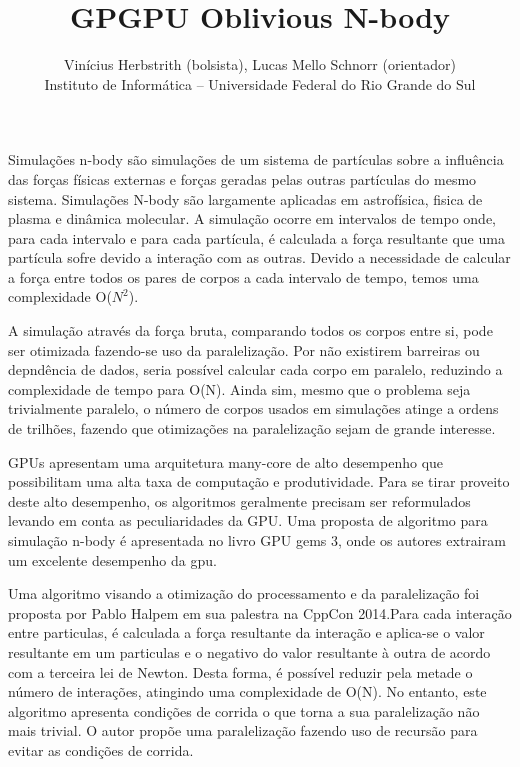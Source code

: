\documentclass[12pt]{article}
\begin{document}
\title{GPGPU Oblivious N-body}

\author{Vinícius Herbstrith (bolsista), Lucas Mello Schnorr (orientador) \\
Instituto de Informática -- Universidade Federal do Rio Grande do Sul}
\date{}

\maketitle


Simulações n-body são simulações de um sistema de partículas sobre a influência das forças físicas externas e forças geradas pelas outras partículas do mesmo sistema. Simulações N-body são largamente aplicadas em astrofísica, fisica de plasma e dinâmica molecular.
A simulação ocorre em intervalos de tempo onde, para cada intervalo e para cada partícula, é calculada a força resultante que uma partícula  sofre devido a interação com as outras. Devido a necessidade de calcular a força entre todos os pares de corpos a cada intervalo de tempo, temos uma complexidade O($N^2$). 

A simulação através da força bruta, comparando todos os corpos entre si, pode ser otimizada fazendo-se uso da paralelização. Por não existirem
barreiras ou depndência de dados, seria possível calcular cada corpo em paralelo, reduzindo a complexidade de tempo para O(N).
Ainda sim, mesmo que o problema seja trivialmente paralelo, o número de corpos usados em simulações atinge a ordens de trilhões, fazendo que otimizações na paralelização sejam de grande interesse.

GPUs apresentam uma arquitetura many-core de alto desempenho que possibilitam uma alta taxa de computação e produtividade. Para se tirar proveito deste alto desempenho, os algoritmos geralmente precisam ser reformulados levando em conta as peculiaridades da GPU. Uma proposta de algoritmo para simulação n-body é apresentada no livro GPU gems 3, onde os autores extrairam um excelente desempenho da gpu.

Uma algoritmo visando a otimização do processamento e da paralelização foi proposta por Pablo Halpem em sua palestra na CppCon 2014.Para cada interação entre particulas, é calculada a força resultante da interação e aplica-se o valor resultante em um particulas e o negativo do valor resultante à outra de acordo com a terceira lei de Newton. Desta forma, é possível reduzir pela metade o número de interações, atingindo uma complexidade de O(N). No entanto, este algoritmo apresenta condições de corrida o que torna a sua paralelização não mais trivial. O autor propõe uma paralelização fazendo uso de recursão para evitar as condições de corrida.
\end{document}
